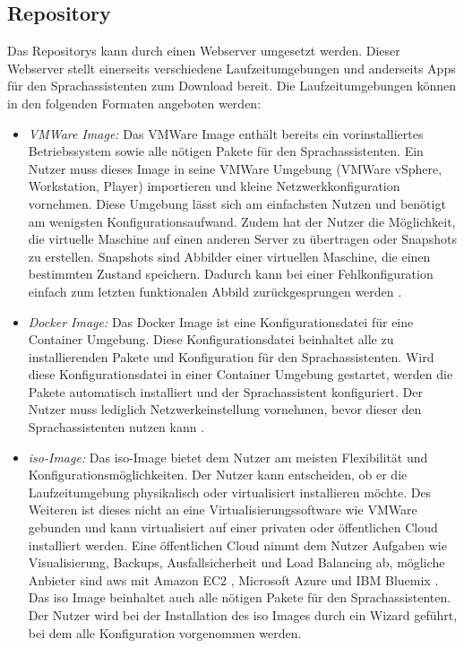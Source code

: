 \subsection{Repository}
Das Repositorys kann durch einen Webserver umgesetzt werden. Dieser Webserver stellt einerseits verschiedene Laufzeitumgebungen und anderseits Apps für den Sprachassistenten zum Download bereit. Die Laufzeitumgebungen können in den folgenden Formaten angeboten werden:
\begin{itemize}
	\item \textsl{VMWare Image:} Das VMWare Image enthält bereits ein vorinstalliertes Betriebssystem sowie alle nötigen Pakete für den Sprachassistenten. Ein Nutzer muss dieses Image in seine VMWare Umgebung (VMWare vSphere, Workstation, Player) importieren und kleine Netzwerkkonfiguration vornehmen. Diese Umgebung lässt sich am einfachsten Nutzen und benötigt am wenigsten Konfigurationsaufwand. Zudem hat der Nutzer die Möglichkeit, die virtuelle Maschine auf einen anderen Server zu übertragen oder Snapshots zu erstellen. Snapshots sind Abbilder einer virtuellen Maschine, die einen bestimmten Zustand speichern. Dadurch kann bei einer Fehlkonfiguration einfach zum letzten funktionalen Abbild zurückgesprungen werden \cite{VMWare}.
	\item \textsl{Docker Image:} Das Docker Image ist eine Konfigurationsdatei für eine Container Umgebung. Diese Konfigurationsdatei beinhaltet alle zu installierenden Pakete und Konfiguration für den Sprachassistenten. Wird diese Konfigurationsdatei in einer Container Umgebung gestartet, werden die Pakete automatisch installiert und der Sprachassistent konfiguriert. Der Nutzer muss lediglich Netzwerkeinstellung vornehmen, bevor dieser den Sprachassistenten nutzen kann \cite{Docker}.
	\item \textsl{\acs{iso}-Image:} Das \acs{iso}-Image bietet dem Nutzer am meisten Flexibilität und Konfigurationsmöglichkeiten. Der Nutzer kann entscheiden, ob er die Laufzeitumgebung physikalisch oder virtualisiert installieren möchte. Des Weiteren ist dieses nicht an eine Virtualisierungssoftware wie VMWare gebunden und kann virtualisiert auf einer privaten oder öffentlichen Cloud installiert werden. Eine öffentlichen Cloud nimmt dem Nutzer Aufgaben wie Visualisierung, Backups, Ausfallsicherheit und Load Balancing ab, mögliche Anbieter sind \ac{aws} mit Amazon EC2 \cite{AWSAmazonEC2}, Microsoft Azure \cite{MicrosoftAzure} und IBM Bluemix \cite{IBMBluemix}. Das \acs{iso} Image beinhaltet auch alle nötigen Pakete für den Sprachassistenten. Der Nutzer wird bei der Installation des \acs{iso} Images durch ein Wizard geführt, bei dem alle Konfiguration vorgenommen werden.
\end{itemize}

